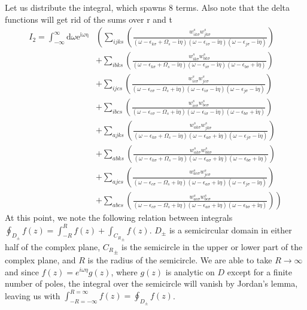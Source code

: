 \documentclass[12pt]{caltech_thesis}
\begin{document}
Let us distribute the integral, which spawns 8 terms. Also note that the delta functions will get rid of the sums over r and t
\begin{equation}
\begin{aligned}
I_2 = \int_{-\infty }^{\infty }\mathrm{d} \omega \mathrm{e}^{\mathrm{i \omega \eta}} 
& \left( \sum_{ijks} \left( \frac{w_{i k \sigma}^s w_{j k \sigma}^s}{(\omega-\epsilon_{k \sigma}+\Omega_s-\mathrm{i} \eta)(\omega-\epsilon_{i \sigma}-\mathrm{i} \eta)(\omega-\epsilon_{j \sigma}-\mathrm{i} \eta)} \right) \right.\\
& \left. + \sum_{ibks} \left( \frac{w_{i k \sigma}^s w_{b k \sigma}^s}{(\omega-\epsilon_{k \sigma}+\Omega_s-\mathrm{i} \eta)(\omega-\epsilon_{i \sigma}-\mathrm{i} \eta)(\omega-\epsilon_{b \sigma}+\mathrm{i} \eta)} \right) \right.\\
& \left. + \sum_{ijcs} \left( \frac{w_{i c \sigma}^s w_{j c \sigma}^s}{(\omega-\epsilon_{c \sigma}-\Omega_s+\mathrm{i} \eta)(\omega-\epsilon_{i \sigma}-\mathrm{i} \eta)(\omega-\epsilon_{j \sigma}-\mathrm{i} \eta)} \right) \right.\\
& \left. + \sum_{ibcs} \left( \frac{w_{i c \sigma}^s w_{b c \sigma}^s}{(\omega-\epsilon_{c \sigma}-\Omega_s+\mathrm{i} \eta)(\omega-\epsilon_{i \sigma}-\mathrm{i} \eta)(\omega-\epsilon_{b \sigma}+\mathrm{i} \eta)} \right) \right. \\
& \left. + \sum_{ajks} \left( \frac{w_{a k \sigma}^s w_{j k \sigma}^s}{(\omega-\epsilon_{k \sigma}+\Omega_s-\mathrm{i} \eta)(\omega-\epsilon_{a \sigma}+\mathrm{i} \eta)(\omega-\epsilon_{j \sigma}-\mathrm{i} \eta)} \right) \right.\\
& \left. + \sum_{abks} \left( \frac{w_{a k \sigma}^s w_{b k \sigma}^s}{(\omega-\epsilon_{k \sigma}+\Omega_s-\mathrm{i} \eta)(\omega-\epsilon_{a \sigma}+\mathrm{i} \eta)(\omega-\epsilon_{b \sigma}+\mathrm{i} \eta)} \right) \right.\\
& \left. + \sum_{ajcs} \left( \frac{w_{a c \sigma}^s w_{j c \sigma}^s}{(\omega-\epsilon_{c \sigma}-\Omega_s+\mathrm{i} \eta)(\omega-\epsilon_{a \sigma}+\mathrm{i} \eta)(\omega-\epsilon_{j \sigma}-\mathrm{i} \eta)} \right) \right.\\
& \left. + \sum_{abcs} \left( \frac{w_{a c \sigma}^s w_{b c \sigma}^s}{(\omega-\epsilon_{c \sigma}-\Omega_s+\mathrm{i} \eta)(\omega-\epsilon_{a \sigma}+\mathrm{i} \eta)(\omega-\epsilon_{b \sigma}+\mathrm{i} \eta)} \right) \right)
\label{eqnexpanded_integral}
\end{aligned}
\end{equation}
At this point, we note the following relation between integrals $\oint_{D_{\pm}} f(z) = \int_{-R}^R f(z) + \int_{{C_R}_{\pm}} f(z)$. $D_{\pm}$ is a semicircular domain in either half of the complex plane, ${C_R}_{\pm}$ is the semicircle in the upper or lower part of the complex plane, and $R$ is the radius of the semicircle. We are able to take $R\rightarrow \infty$ and since $f(z)=e^{i\omega \eta}g(z)$, where $g(z)$ is analytic on $D$ except for a finite number of poles, the integral over the semicircle will vanish by Jordan's lemma, leaving us with $\int_{-R=-\infty}^{R=\infty} f(z)= \oint_{D_{\pm}} f(z)$. 
\end{document}
